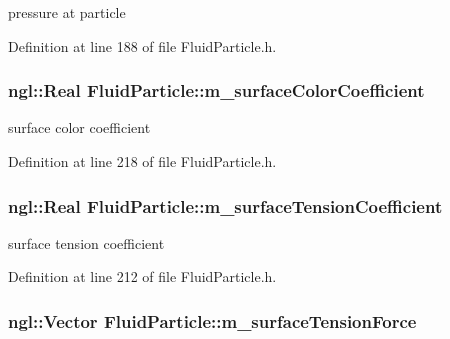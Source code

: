 pressure at particle 



Definition at line 188 of file FluidParticle.h.

\hypertarget{class_fluid_particle_a1bafc97f79f73eed857df1bbba79a3b8}{
\subsubsection[{m\_\-surfaceColorCoefficient}]{\setlength{\rightskip}{0pt plus 5cm}ngl::Real {\bf FluidParticle::m\_\-surfaceColorCoefficient}}}
\label{class_fluid_particle_a1bafc97f79f73eed857df1bbba79a3b8}


surface color coefficient 



Definition at line 218 of file FluidParticle.h.

\hypertarget{class_fluid_particle_a9b07a93d8ec041692c3ad99319c08939}{
\subsubsection[{m\_\-surfaceTensionCoefficient}]{\setlength{\rightskip}{0pt plus 5cm}ngl::Real {\bf FluidParticle::m\_\-surfaceTensionCoefficient}}}
\label{class_fluid_particle_a9b07a93d8ec041692c3ad99319c08939}


surface tension coefficient 



Definition at line 212 of file FluidParticle.h.

\hypertarget{class_fluid_particle_ac2bbf04b2f814d332ed7dc5113472471}{
\subsubsection[{m\_\-surfaceTensionForce}]{\setlength{\rightskip}{0pt plus 5cm}ngl::Vector {\bf FluidParticle::m\_\-surfaceTensionForce}}}
\label{class_fluid_particle_ac2bbf04b2f814d332ed7dc5113472471}


